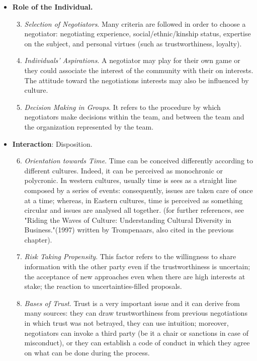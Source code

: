 \documentclass[../main.tex]{subfiles}
\begin{document}
\begin{itemize}
\begin{enumerate}
    \end{enumerate}
    
    \item \textbf{Role of the Individual.}
    \begin{enumerate}
        \setcounter{enumi}{2}
        
        \item \textit{Selection of Negotiators}. Many criteria are followed in order to choose a negotiator: negotiating experience, social/ethnic/kinship status, expertise on the subject, and personal virtues (such as trustworthiness, loyalty). 
        \item \textit{Individuals' Aspirations}. A negotiator may play for their own game or they could associate the interest of the community with their on interests. The attitude toward the negotiations interests may also be influenced by culture.
        \item \textit{Decision Making in Groups}. It refers to the procedure by which negotiators make decisions within the team, and between the team and the organization represented by the team.
    \end{enumerate}
    
    \item \textbf{Interaction}: Disposition.
    \begin{enumerate}
        \setcounter{enumi}{5}
        
        \item \textit{Orientation towards Time}. Time can be conceived differently according to different cultures. Indeed, it can be perceived as monochronic or polycronic. In western cultures, usually time is sees as a straight line composed by a series of events: consequently, issues are taken care of once at a time; whereas, in Eastern cultures, time is perceived as something circular and issues are analysed all together. (for further references, see "Riding the Waves of Culture: Understanding Cultural Diversity in Business."(1997) written by Trompenaars, also cited in the previous chapter).
        \item \textit{Risk Taking Propensity}. This factor refers to the willingness to share information with the other party even if the trustworthiness is uncertain; the acceptance of new approaches even when there are high interests at stake; the reaction to uncertainties-filled proposals.
        \item \textit{Bases of Trust}. Trust is a very important issue and it can derive from many sources: they can draw trustworthiness from previous negotiations in which trust was not betrayed, they can use intuition; moreover, negotiators can invoke a third party (be it a chair or sanctions in case of misconduct), or they can establish a code of conduct in which they agree on what can be done during the process.
    \end{enumerate}
    

\end{itemize}
\end{document}
